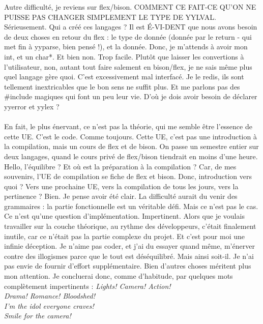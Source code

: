 \newline \newline
Autre difficulté, je reviens sur flex/bison. COMMENT CE FAIT-CE QU'ON NE PUISSE PAS CHANGER SIMPLEMENT LE TYPE DE YYLVAL. Sérieusement. Qui a créé ces langages ? Il est É-VI-DENT que nous avons besoin de deux choses en retour du flex : le type de donnée (donnée par le return - qui met fin à yyparse, bien pensé !), et la donnée. Donc, je m'attends à avoir mon int, et un char*. Et bien non. Trop facile. Plutôt que laisser les convertions à l'utilisateur, non, autant tout faire salement en bison/flex, je ne sais même plus quel langage gère quoi. C'est excessivement mal interfacé. Je le redis, ils sont tellement inextricables que le bon sens ne suffit plus. Et me parlons pas des \#include magiques qui font un peu leur vie. D'où je dois avoir besoin de déclarer yyerror et yylex ?\\\\
En fait, le plus énervant, ce n'est pas la théorie, qui me semble être l'essence de cette UE. C'est le code. Comme toujours. Cette UE, c'est pas une introduction à la compilation, mais un cours de flex et de bison. On passe un semestre entier sur deux langages, quand le cours privé de flex/bison tiendrait en moins d'une heure. Hello, l'équilibre ? Et où est la préparation à la compilation ? Car, de mes souvenirs, l'UE de compilation se fiche de flex et bison. Donc, introduction vers quoi ? Vers une prochaine UE, vers la compilation de tous les jours, vers la pertinence ?
\newline \newline
Bien. Je pense avoir été clair. La difficulté aurait du venir des grammaires : la partie fonctionnelle est un véritable défi. Mais ce n'est pas le cas. Ce n'est qu'une question d'implémentation. Impertinent. Alors que je voulais travailler sur la couche théorique, au rythme des développeurs, c'était finalement inutile, car ce n'était pas la partie complexe du projet. Et c'est pour moi une infinie déception. Je n'aime pas coder, et j'ai du essayer quand même, m'énerver contre des illogismes parce que le tout est déséquilibré.
\newline \newline
Mais ainsi soit-il. Je n'ai pas envie de fournir d'effort supplémentaire. Bien d'autres choses méritent plus mon attention. Je concluerai donc, comme d'habitude, par quelques mots complètement impertinents :
\newline \newline
\em{}Lights! Camera! Action!\\
Drama! Romance! Bloodshed!\\
I'm the idol everyone craves!\\
Smile for the camera!\em{}\\

